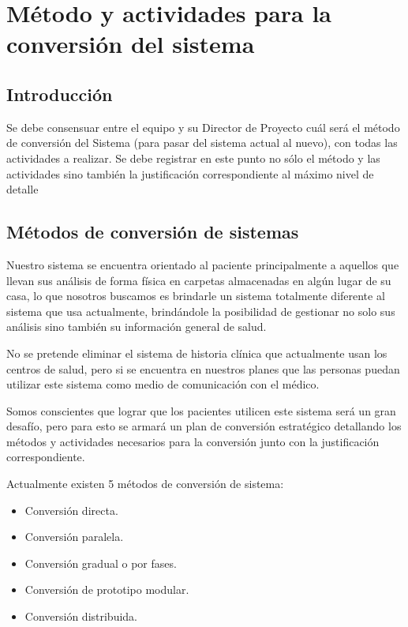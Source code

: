 \newpage

\section{Método y actividades para la conversión del sistema}

\subsection{Introducción}

Se debe consensuar entre el equipo y su Director de Proyecto cuál será el método de conversión del Sistema (para pasar del sistema actual al nuevo), con todas las actividades a realizar. Se debe registrar en este punto no sólo el método y las actividades sino también la justificación correspondiente al máximo nivel de detalle

\subsection{Métodos de conversión de sistemas}

Nuestro sistema se encuentra orientado al paciente principalmente a aquellos que llevan sus análisis de forma física en carpetas almacenadas en algún lugar de su casa, lo que nosotros buscamos es brindarle un sistema totalmente diferente al sistema que usa actualmente, brindándole la posibilidad de gestionar no solo sus análisis sino también su información general de salud.

No se pretende eliminar el sistema de historia clínica que actualmente usan los centros de salud, pero si se encuentra en nuestros planes que las personas puedan utilizar este sistema como medio de comunicación con el médico.

Somos conscientes que lograr que los pacientes utilicen este sistema será un gran desafío, pero para esto se armará un plan de conversión estratégico detallando los métodos y actividades necesarios para la conversión junto con la justificación correspondiente.

Actualmente  existen 5 métodos de conversión de sistema:
\begin{itemize}
\item Conversión directa.
\item Conversión paralela.
\item Conversión gradual o por fases.
\item Conversión de prototipo modular.
\item Conversión distribuida.
\end{itemize}

